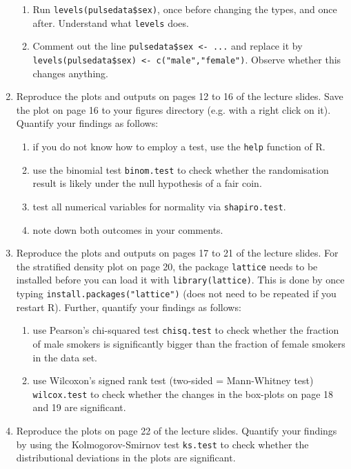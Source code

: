 \begin{enumerate}
\begin{enumerate}
\item Run \texttt{levels(pulsedata\$sex)}, once before changing the types, and once after. Understand what \texttt{levels} does.
\item Comment out the line \texttt{pulsedata\$sex <- ...} and replace it by\\
  \texttt{levels(pulsedata\$sex) <- c("male","female")}. Observe whether this changes anything.
\end{enumerate}

\item Reproduce the plots and outputs on pages 12 to 16 of the lecture slides. Save the plot on page 16 to your figures directory (e.g. with a right click on it). Quantify your findings as follows:
\begin{enumerate}
\item if you do not know how to employ a test, use the \texttt{help} function of R.
\item use the binomial test \texttt{binom.test} to check whether the randomisation result is likely under the null hypothesis of a fair coin.
\item test all numerical variables for normality via \texttt{shapiro.test}.
\item note down both outcomes in your comments.
\end{enumerate}

\item Reproduce the plots and outputs on pages 17 to 21 of the lecture slides. For the stratified density plot on page 20, the package \texttt{lattice} needs to be installed before you can load it with \texttt{library(lattice)}. This is done by once typing \texttt{install.packages("lattice")} (does not need to be repeated if you restart R).
Further, quantify your findings as follows:
\begin{enumerate}
\item use Pearson's chi-squared test \texttt{chisq.test} to check whether the fraction of male smokers is significantly bigger than the fraction of female smokers in the data set.
\item use Wilcoxon's signed rank test (two-sided = Mann-Whitney test) \texttt{wilcox.test} to check whether the changes in the box-plots on page 18 and 19 are significant.
\end{enumerate}

\item Reproduce the plots on page 22 of the lecture slides. Quantify your findings by using the Kolmogorov-Smirnov test \texttt{ks.test} to check whether the distributional deviations in the plots are significant.


\end{enumerate}
